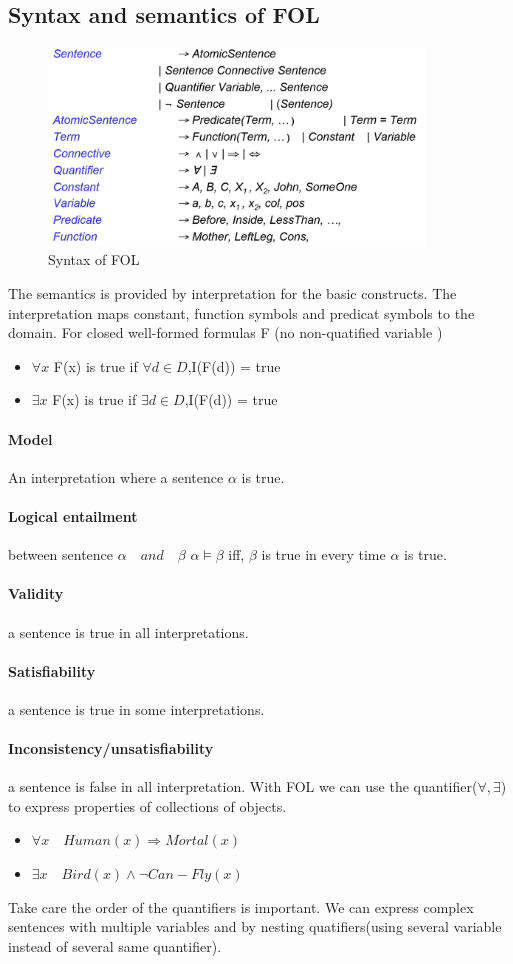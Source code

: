 \subsection{Syntax and semantics of FOL}
	\begin{figure}[h]
		\centering
		\includegraphics[width=10cm]{fol_bnf.png}
		\caption{Syntax of FOL}
	\end{figure}
	The semantics is provided by interpretation for the basic constructs. The interpretation maps 
	constant, function symbols and predicat symbols to the domain.
	For closed well-formed formulas F (no non-quatified variable )
	\begin{itemize}
		\item $\forall x$ F(x) is true if $\forall d\in D$,I(F(d)) = true
		\item $\exists x$ F(x) is true if $\exists d\in D$,I(F(d)) = true
	\end{itemize}
	\paragraph{Model} An interpretation where a sentence $\alpha$ is true.
	\paragraph{Logical entailment} between sentence $\alpha \quad and \quad \beta$ $\alpha\models\beta$
	iff, $\beta$ is true in every time $\alpha$ is true.
	\paragraph{Validity} a sentence is true in all interpretations.
	\paragraph{Satisfiability} a sentence is true in some interpretations.
	\paragraph{Inconsistency/unsatisfiability} a sentence is false in all interpretation.
	With FOL we can use the quantifier($\forall,\exists$) to express properties of collections of objects.
	\begin{itemize}
		\item $\forall x\quad Human(x) \Rightarrow Mortal(x)$
		\item $\exists x \quad Bird(x) \wedge \neg Can-Fly(x)$
	\end{itemize}
	Take care the order of the quantifiers is important.  We can express complex sentences with multiple 
	variables and by nesting quatifiers(using several variable instead of several same quantifier).
	
